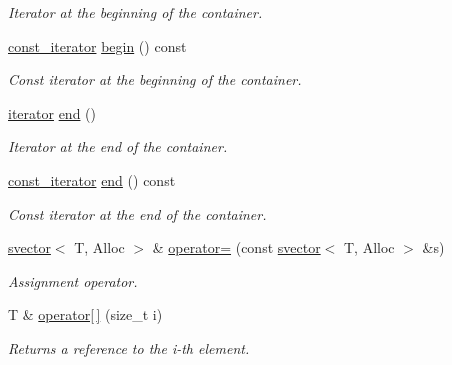 \begin{DoxyCompactItemize}
\begin{DoxyCompactList}\small\item\em Iterator at the beginning of the container. \end{DoxyCompactList}\item 
\hyperlink{classlgraph_1_1utils_1_1svector_a50774ce617a742e76f3fb8cc0a7a9445}{const\+\_\+iterator} \hyperlink{classlgraph_1_1utils_1_1svector_a7130177e6dfb14ee07f5bdadcc97706c}{begin} () const
\begin{DoxyCompactList}\small\item\em Const iterator at the beginning of the container. \end{DoxyCompactList}\item 
\hyperlink{classlgraph_1_1utils_1_1svector_a518288794e754e27d2e2274ced4485a6}{iterator} \hyperlink{classlgraph_1_1utils_1_1svector_a07bc452bc6022b65a0399de60b600565}{end} ()
\begin{DoxyCompactList}\small\item\em Iterator at the end of the container. \end{DoxyCompactList}\item 
\hyperlink{classlgraph_1_1utils_1_1svector_a50774ce617a742e76f3fb8cc0a7a9445}{const\+\_\+iterator} \hyperlink{classlgraph_1_1utils_1_1svector_a4613e678ccd2f35d91dcf6413f524e61}{end} () const
\begin{DoxyCompactList}\small\item\em Const iterator at the end of the container. \end{DoxyCompactList}\item 
\mbox{\label{classlgraph_1_1utils_1_1svector_ad57a44da3d8b2459dbd209d5d8b7a3c9}} 
\hyperlink{classlgraph_1_1utils_1_1svector}{svector}$<$ T, Alloc $>$ \& \hyperlink{classlgraph_1_1utils_1_1svector_ad57a44da3d8b2459dbd209d5d8b7a3c9}{operator=} (const \hyperlink{classlgraph_1_1utils_1_1svector}{svector}$<$ T, Alloc $>$ \&s)
\begin{DoxyCompactList}\small\item\em Assignment operator. \end{DoxyCompactList}\item 
T \& \hyperlink{classlgraph_1_1utils_1_1svector_a6943d4e89de5500202b9b01433b0f466}{operator\mbox{[}$\,$\mbox{]}} (size\+\_\+t i)
\begin{DoxyCompactList}\small\item\em Returns a reference to the i-\/th element. \end{DoxyCompactList}\item 

\end{DoxyCompactItemize}
